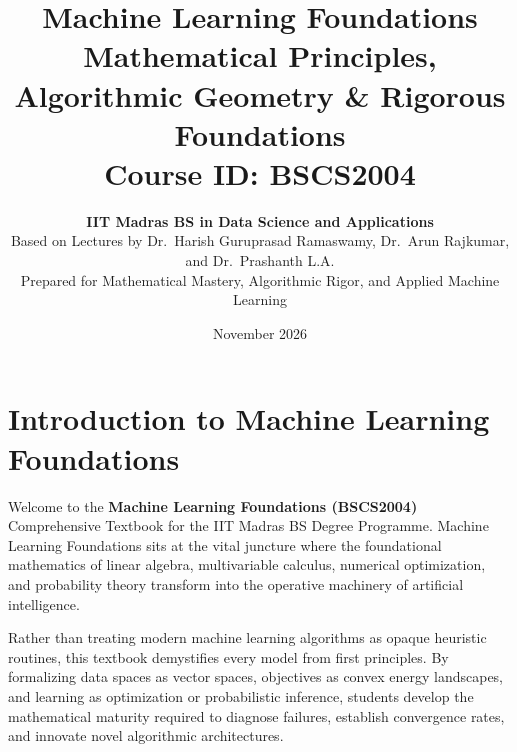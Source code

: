 \documentclass[11pt,a4paper,oneside]{book}
\title{
    \Huge \bfseries \sffamily \color{primarydark} Machine Learning Foundations \\
    \large \vspace{0.3cm} \color{tealdef} Mathematical Principles, Algorithmic Geometry \& Rigorous Foundations \\
    \vspace{0.2cm} \normalsize \color{primarydark} Course ID: BSCS2004
}
\author{
    \textbf{IIT Madras BS in Data Science and Applications} \\
    \small Based on Lectures by Dr.~Harish Guruprasad Ramaswamy, Dr.~Arun Rajkumar, and Dr.~Prashanth L.A. \\
    \small Prepared for Mathematical Mastery, Algorithmic Rigor, and Applied Machine Learning
}
\date{November 2026}
\begin{document}
\frontmatter
\maketitle
\tableofcontents
\newpage

\chapter*{Introduction to Machine Learning Foundations}

Welcome to the \textbf{Machine Learning Foundations (BSCS2004)} Comprehensive Textbook for the IIT Madras BS Degree Programme. Machine Learning Foundations sits at the vital juncture where the foundational mathematics of linear algebra, multivariable calculus, numerical optimization, and probability theory transform into the operative machinery of artificial intelligence.

Rather than treating modern machine learning algorithms as opaque heuristic routines, this textbook demystifies every model from first principles. By formalizing data spaces as vector spaces, objectives as convex energy landscapes, and learning as optimization or probabilistic inference, students develop the mathematical maturity required to diagnose failures, establish convergence rates, and innovate novel algorithmic architectures.
\end{document}

